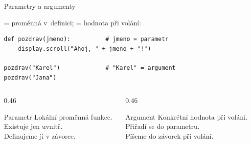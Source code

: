 \begin{frame}[fragile]{Parametry a argumenty}

   = proměnná v~definici;  = hodnota při volání:

  \bigskip
  \begin{lstlisting}
def pozdrav(jmeno):          # jmeno = parametr
    display.scroll("Ahoj, " + jmeno + "!")

pozdrav("Karel")             # "Karel" = argument
pozdrav("Jana")
  \end{lstlisting}

  \bigskip
  \begin{columns}[T]
    \begin{column}{0.46\textwidth}
      \begin{block}{Parametr}
        Lokální proměnná funkce.\\
        Existuje jen uvnitř.\\
        Definujeme ji v závorce.
      \end{block}
    \end{column}
    \begin{column}{0.46\textwidth}
      \begin{block}{Argument}
        Konkrétní hodnota při volání.\\
        Přiřadí se do parametru.\\
        Píšeme do závorek při volání.
      \end{block}
    \end{column}
  \end{columns}
\end{frame}

